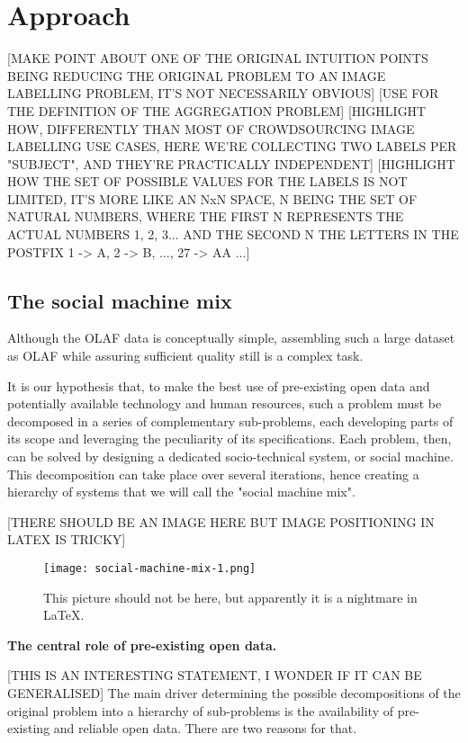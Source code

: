 \section{Approach}

\cite{Difallah:2012ty}

[MAKE POINT ABOUT ONE OF THE ORIGINAL INTUITION POINTS BEING REDUCING THE ORIGINAL PROBLEM TO AN IMAGE LABELLING PROBLEM, IT'S NOT NECESSARILY OBVIOUS]
[USE \cite{Quinn:2011dj} FOR THE DEFINITION OF THE AGGREGATION PROBLEM]
[HIGHLIGHT HOW, DIFFERENTLY THAN MOST OF CROWDSOURCING IMAGE LABELLING USE CASES, HERE WE'RE COLLECTING TWO LABELS PER "SUBJECT", AND THEY'RE PRACTICALLY INDEPENDENT]
[HIGHLIGHT HOW THE SET OF POSSIBLE VALUES FOR THE LABELS IS NOT LIMITED, IT'S MORE LIKE AN NxN SPACE, N BEING THE SET OF NATURAL NUMBERS, WHERE THE FIRST N REPRESENTS THE ACTUAL NUMBERS 1, 2, 3... AND THE SECOND N THE LETTERS IN THE POSTFIX 1 -> A, 2 -> B, ..., 27 -> AA ...]

\subsection{The social machine mix}

    Although the OLAF data is conceptually simple, assembling such a large dataset as OLAF while assuring sufficient quality still is a complex task.
    
    It is our hypothesis that, to make the best use of pre-existing open data and potentially available technology and human resources, such a problem must be decomposed in a series of complementary sub-problems, each developing parts of its scope and leveraging the peculiarity of its specifications. Each problem, then, can be solved by designing a dedicated socio-technical system, or social machine. This decomposition can take place over several iterations, hence creating a hierarchy of systems that we will call the "social machine mix". 
    
    [THERE SHOULD BE AN IMAGE HERE BUT IMAGE POSITIONING IN LATEX IS TRICKY]

    \begin{figure*}
    	\texttt{[image: social-machine-mix-1.png]}
    	\caption{This picture should not be here, but apparently it is a nightmare in LaTeX.}
    	\label{fig:social_machine_mix_1}
    \end{figure*}
    
    \textbf{The central role of pre-existing open data.} 
    
    [THIS IS AN INTERESTING STATEMENT, I WONDER IF IT CAN BE GENERALISED] The main driver determining the possible decompositions of the original problem into a hierarchy of sub-problems is the availability of pre-existing and reliable open data. There are two reasons for that.

